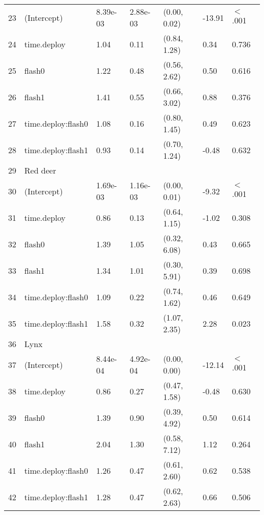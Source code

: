 \begin{table}[ht]
\begin{tabular}{rllllll}
  23 & (Intercept) & 8.39e-03 & 2.88e-03 & (0.00, 0.02) & -13.91 & $<$ .001 \\ 
  24 & time.deploy & 1.04 & 0.11 & (0.84, 1.28) & 0.34 & 0.736  \\ 
  25 & flash0 & 1.22 & 0.48 & (0.56, 2.62) & 0.50 & 0.616  \\ 
  26 & flash1 & 1.41 & 0.55 & (0.66, 3.02) & 0.88 & 0.376  \\ 
  27 & time.deploy:flash0 & 1.08 & 0.16 & (0.80, 1.45) & 0.49 & 0.623  \\ 
  28 & time.deploy:flash1 & 0.93 & 0.14 & (0.70, 1.24) & -0.48 & 0.632  \\ 
  29 & Red deer &  &  &  &  &        \\ 
  30 & (Intercept) & 1.69e-03 & 1.16e-03 & (0.00, 0.01) & -9.32 & $<$ .001 \\ 
  31 & time.deploy & 0.86 & 0.13 & (0.64, 1.15) & -1.02 & 0.308  \\ 
  32 & flash0 & 1.39 & 1.05 & (0.32, 6.08) & 0.43 & 0.665  \\ 
  33 & flash1 & 1.34 & 1.01 & (0.30, 5.91) & 0.39 & 0.698  \\ 
  34 & time.deploy:flash0 & 1.09 & 0.22 & (0.74, 1.62) & 0.46 & 0.649  \\ 
  35 & time.deploy:flash1 & 1.58 & 0.32 & (1.07, 2.35) & 2.28 & 0.023  \\ 
  36 & Lynx &  &  &  &  &        \\ 
  37 & (Intercept) & 8.44e-04 & 4.92e-04 & (0.00, 0.00) & -12.14 & $<$ .001 \\ 
  38 & time.deploy & 0.86 & 0.27 & (0.47, 1.58) & -0.48 & 0.630  \\ 
  39 & flash0 & 1.39 & 0.90 & (0.39, 4.92) & 0.50 & 0.614  \\ 
  40 & flash1 & 2.04 & 1.30 & (0.58, 7.12) & 1.12 & 0.264  \\ 
  41 & time.deploy:flash0 & 1.26 & 0.47 & (0.61, 2.60) & 0.62 & 0.538  \\ 
  42 & time.deploy:flash1 & 1.28 & 0.47 & (0.62, 2.63) & 0.66 & 0.506  \\ 
   \hline
\end{tabular}
\end{table}
